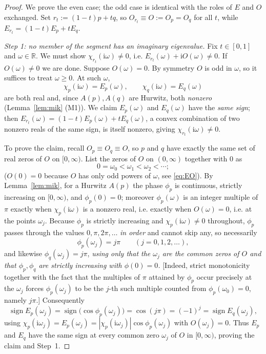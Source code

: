 \documentclass[12pt]{article}
\theoremstyle{definition}
\newcommand{\jj}{\mathrm{i}}
\begin{document}
\begin{proof}
We prove the even case; the odd case is identical with the roles of $E$ and $O$ exchanged.
Set $r_t:=(1-t)p+tq$, so $O_{r_t}\equiv O:=O_p=O_q$ for all $t$, while
$E_{r_t}=(1-t)E_p+tE_q$.

\emph{Step 1: no member of the segment has an imaginary eigenvalue.} Fix $t\in[0,1]$ and
$\omega\in\mathbb R$. We must show $\chi_{r_t}(\jj\omega)\ne0$, i.e.
$E_{r_t}(\omega)+\jj O(\omega)\ne0$. If $O(\omega)\ne0$ we are done. Suppose
$O(\omega)=0$. By symmetry $O$ is odd in $\omega$, so it suffices to treat $\omega\ge0$.
At such $\omega$,
\[
\chi_p(\jj\omega)=E_p(\omega),\qquad \chi_q(\jj\omega)=E_q(\omega)
\]
are both real and, since $A(p),A(q)$ are Hurwitz, both \emph{nonzero} (Lemma~\ref{lem:mik}
(M1)). We claim $E_p(\omega)$ and $E_q(\omega)$ have the \emph{same sign}; then
$E_{r_t}(\omega)=(1-t)E_p(\omega)+tE_q(\omega)$, a convex combination of two nonzero reals
of the same sign, is itself nonzero, giving $\chi_{r_t}(\jj\omega)\ne0$.

To prove the claim, recall $O_p\equiv O_q\equiv O$, so $p$ and $q$ have exactly the same
set of real zeros of $O$ on $[0,\infty)$. List the zeros of $O$ on $(0,\infty)$ together
with $0$ as
\[
0=\omega_0<\omega_1<\omega_2<\cdots ;
\]
($O(0)=0$ because $O$ has only odd powers of $\omega$, see \eqref{eq:EO}). By
Lemma~\ref{lem:mik}, for a Hurwitz $A(p)$ the phase $\phi_p$ is continuous, strictly
increasing on $[0,\infty)$, and $\phi_p(0)=0$; moreover $\phi_p(\omega)$ is an integer
multiple of $\pi$ exactly when $\chi_p(\jj\omega)$ is a nonzero real, i.e. exactly when
$O(\omega)=0$, i.e. at the points $\omega_j$. Because $\phi_p$ is strictly increasing and
$\chi_p(\jj\omega)\ne0$ throughout, $\phi_p$ passes through the values
$0,\pi,2\pi,\dots$ \emph{in order} and cannot skip any, so necessarily
\[
\phi_p(\omega_j)=j\pi\qquad(j=0,1,2,\dots),
\]
and likewise $\phi_q(\omega_j)=j\pi$, \emph{using only that the $\omega_j$ are the common
zeros of $O$ and that $\phi_p,\phi_q$ are strictly increasing with $\phi(0)=0$.}
[Indeed, strict monotonicity together with the fact that the multiples of $\pi$ attained
by $\phi_p$ occur precisely at the $\omega_j$ forces $\phi_p(\omega_j)$ to be the $j$-th
such multiple counted from $\phi_p(\omega_0)=0$, namely $j\pi$.] Consequently
\[
\operatorname{sign}E_p(\omega_j)=\operatorname{sign}\bigl(\cos\phi_p(\omega_j)\bigr)
=\cos(j\pi)=(-1)^j=\operatorname{sign}E_q(\omega_j),
\]
using $\chi_p(\jj\omega_j)=E_p(\omega_j)=|\chi_p(\jj\omega_j)|\cos\phi_p(\omega_j)$ with
$O(\omega_j)=0$. Thus $E_p$ and $E_q$ have the same sign at every common zero $\omega_j$
of $O$ in $[0,\infty)$, proving the claim and Step~1.


\end{proof}
\end{document}
